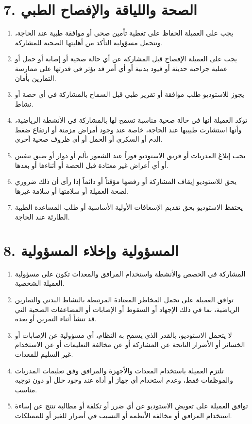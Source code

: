 \documentclass[12pt,a4paper]{article}
\begin{document}
\section*{7. الصحة واللياقة والإفصاح الطبي}
\begin{enumerate}
    \item يجب على العميلة الحفاظ على تغطية تأمين صحي أو موافقة طبية عند الحاجة، وتتحمل مسؤولية التأكد من أهليتها الصحية للمشاركة.
    \item يجب على العميلة الإفصاح قبل المشاركة عن أي حالة صحية أو إصابة أو حمل أو عملية جراحية حديثة أو قيود بدنية أو أي أمر قد يؤثر في قدرتها على ممارسة التمارين بأمان.
    \item يجوز للاستوديو طلب موافقة أو تقرير طبي قبل السماح بالمشاركة في أي حصة أو نشاط.
    \item تؤكد العميلة أنها في حالة صحية مناسبة تسمح لها بالمشاركة في الأنشطة الرياضية، وأنها استشارت طبيبها عند الحاجة، خاصة عند وجود أمراض مزمنة أو ارتفاع ضغط الدم أو السكري أو الحمل أو أي ظروف صحية أخرى.
    \item يجب إبلاغ المدربات أو فريق الاستوديو فوراً عند الشعور بألم أو دوار أو ضيق تنفس أو أي أعراض غير معتادة قبل الحصة أو أثناءها أو بعدها.
    \item يحق للاستوديو إيقاف المشاركة أو رفضها مؤقتاً أو دائماً إذا رأى أن ذلك ضروري لصحة العميلة أو سلامتها أو سلامة غيرها.
    \item يحتفظ الاستوديو بحق تقديم الإسعافات الأولية الأساسية أو طلب المساعدة الطبية الطارئة عند الحاجة.
\end{enumerate}

\section*{8. المسؤولية وإخلاء المسؤولية}
\begin{enumerate}
    \item المشاركة في الحصص والأنشطة واستخدام المرافق والمعدات تكون على مسؤولية العميلة الشخصية.
    \item توافق العميلة على تحمل المخاطر المعتادة المرتبطة بالنشاط البدني والتمارين الرياضية، بما في ذلك الإجهاد أو السقوط أو الإصابات أو المضاعفات الصحية التي قد تنشأ أثناء التمرين أو بعده.
    \item لا يتحمل الاستوديو، بالقدر الذي يسمح به النظام، أي مسؤولية عن الإصابات أو الخسائر أو الأضرار الناتجة عن المشاركة أو عن مخالفة التعليمات أو عن الاستخدام غير السليم للمعدات.
    \item تلتزم العميلة باستخدام المعدات والأجهزة والمرافق وفق تعليمات المدربات والموظفات فقط، وعدم استخدام أي جهاز أو أداة عند وجود خلل أو دون توجيه مناسب.
    \item توافق العميلة على تعويض الاستوديو عن أي ضرر أو تكلفة أو مطالبة تنتج عن إساءة استخدام المرافق أو مخالفة الأنظمة أو التسبب في أضرار للغير أو للممتلكات.
\end{enumerate}
\end{document}
